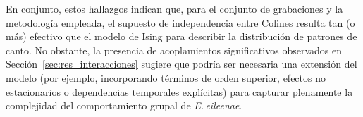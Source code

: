 En conjunto, estos hallazgos indican que, para el conjunto de 
grabaciones y la metodología empleada, el supuesto de 
independencia entre Colines resulta tan (o más) efectivo que el 
modelo de Ising para describir la distribución de patrones de 
canto. No obstante, la presencia de acoplamientos significativos 
observados en Sección~\ref{sec:res_interacciones} sugiere que 
podría ser necesaria una extensión del modelo (por ejemplo, 
incorporando términos de orden superior, efectos no 
estacionarios o dependencias temporales explícitas) para 
capturar plenamente la complejidad del comportamiento grupal de 
\emph{E.\,eileenae}.
